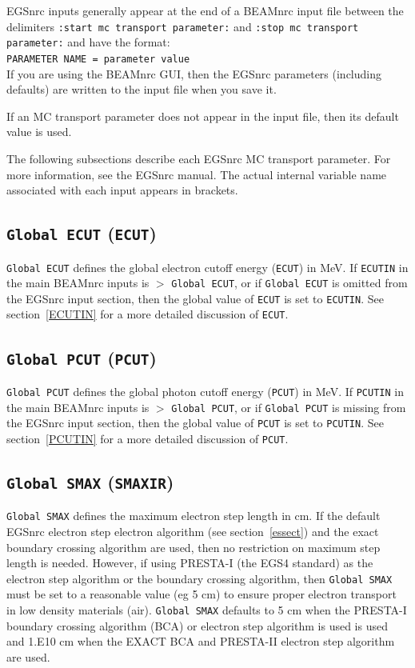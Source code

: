 \documentclass[12pt,twoside]{article}
\begin{document}
EGSnrc inputs generally appear at the end of a BEAMnrc input file
between the
delimiters {\tt :start mc transport parameter:} and
{\tt :stop mc transport parameter:} and have the format:\\
{\tt PARAMETER NAME = parameter value}\\
If you are using the BEAMnrc GUI, then the EGSnrc parameters
(including defaults) are written to the input file when you save it.

If an MC transport parameter does not appear in the input file,
then its default value is used.

The following subsections describe each EGSnrc MC transport parameter.
For more information, see the EGSnrc manual\cite{KR03}. The
actual internal variable name associated with each input appears in brackets.

\subsection{ {\tt Global ECUT} ({\tt ECUT})}
\label{globalecutsect}
{\tt Global ECUT} defines the global electron cutoff energy ({\tt ECUT})
in MeV.  If {\tt ECUTIN}
in the main
BEAMnrc inputs is $>$ {\tt Global ECUT}, or if {\tt Global ECUT} is
omitted from the EGSnrc input section, then the global value of
{\tt ECUT} is set to {\tt ECUTIN}.  See section~\ref{ECUTIN} for a more
detailed discussion of {\tt ECUT}.

\subsection{ {\tt Global PCUT} ({\tt PCUT})}
\label{globalpcutsect}
{\tt Global PCUT} defines the global photon cutoff energy ({\tt PCUT})
in MeV.
If {\tt PCUTIN} in the main
BEAMnrc inputs is $>$ {\tt Global PCUT}, or if {\tt Global PCUT} is
missing from the EGSnrc input section, then the global value of
{\tt PCUT} is set to {\tt PCUTIN}.  See section~\ref{PCUTIN} for a more
detailed discussion of {\tt PCUT}.

\subsection{{\tt Global SMAX} ({\tt SMAXIR})}
{\tt Global SMAX} defines the maximum electron step length in cm.  If the
default EGSnrc electron step electron algorithm (see
section~\ref{essect}) and the exact boundary crossing algorithm are used, then no
restriction on maximum step length is needed.  However, if using
PRESTA-I (the EGS4 standard) as the electron step algorithm or the boundary
crossing algorithm, then
{\tt Global SMAX} must be set to a reasonable value (eg 5 cm) to ensure
proper electron transport in low density materials (air).
{\tt Global SMAX} defaults to 5 cm when the PRESTA-I boundary crossing
algorithm (BCA) or electron step algorithm is used is used and 1.E10 cm
when the EXACT BCA and PRESTA-II electron step algorithm are used.
\end{document}
